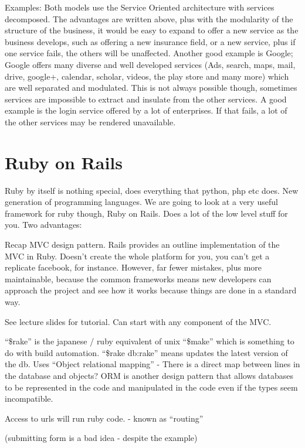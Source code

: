 \documentclass[11pt]{article}
\begin{document}
Examples: Both models use the Service Oriented architecture with services decomposed. The advantages are written above, plus with the modularity of the structure of the business, it would be easy to expand to offer a new service as the business develops, such as offering a new insurance field, or a new service, plus if one service fails, the others will be unaffected. Another good example is Google; Google offers many diverse and well developed services (Ads, search, maps, mail, drive, google+, calendar, scholar, videos, the play store and many more) which are well separated and modulated. This is not always possible though, sometimes services are impossible to extract and insulate from the other services. A good example is the login service offered by a lot of enterprises. If that fails, a lot of the other services may be rendered unavailable.


\section{Ruby on Rails}

Ruby by itself is nothing special, does everything that python, php etc does. New generation of programming languages. We are going to look at a very useful framework for ruby though, Ruby on Rails. Does a lot of the low level stuff for you. Two advantages:
 
 

Recap MVC design pattern. Rails provides an outline implementation of the MVC in Ruby. Doesn’t create the whole platform for you, you can’t get a replicate facebook, for instance. However, far fewer mistakes, plus more maintainable, because the common frameworks means new developers can approach the project and see how it works because things are done in a standard way.

See lecture slides for tutorial. Can start with any component of the MVC.

``\$rake'' is the japanese / ruby equivalent of unix ``\$make'' which is something to do with build automation.
``\$rake db:rake'' means updates the latest version of the db. Uses ``Object relational mapping'' - There is a direct map between lines in the database and objects? ORM is another design pattern that allows databases to be represented in the code and manipulated in the code even if the types seem incompatible.

Access to urls will run ruby code. - known as ``routing''

(submitting form is a bad idea - despite the example)
\end{document}
